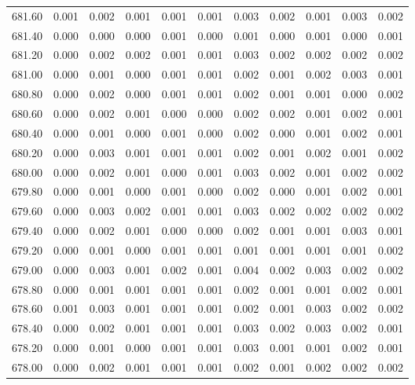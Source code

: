 \begin{longtable}{cccccccccc}
    681.60 &  0.001 &  0.002 &  0.001 &  0.001 &  0.001 &  0.003 &  0.002 &  0.001 &  0.003 &  0.002 \\
    681.40 &  0.000 &  0.000 &  0.000 &  0.001 &  0.000 &  0.001 &  0.000 &  0.001 &  0.000 &  0.001 \\
    681.20 &  0.000 &  0.002 &  0.002 &  0.001 &  0.001 &  0.003 &  0.002 &  0.002 &  0.002 &  0.002 \\
    681.00 &  0.000 &  0.001 &  0.000 &  0.001 &  0.001 &  0.002 &  0.001 &  0.002 &  0.003 &  0.001 \\
    680.80 &  0.000 &  0.002 &  0.000 &  0.001 &  0.001 &  0.002 &  0.001 &  0.001 &  0.000 &  0.002 \\
    680.60 &  0.000 &  0.002 &  0.001 &  0.000 &  0.000 &  0.002 &  0.002 &  0.001 &  0.002 &  0.001 \\
    680.40 &  0.000 &  0.001 &  0.000 &  0.001 &  0.000 &  0.002 &  0.000 &  0.001 &  0.002 &  0.001 \\
    680.20 &  0.000 &  0.003 &  0.001 &  0.001 &  0.001 &  0.002 &  0.001 &  0.002 &  0.001 &  0.002 \\
    680.00 &  0.000 &  0.002 &  0.001 &  0.000 &  0.001 &  0.003 &  0.002 &  0.001 &  0.002 &  0.002 \\
    679.80 &  0.000 &  0.001 &  0.000 &  0.001 &  0.000 &  0.002 &  0.000 &  0.001 &  0.002 &  0.001 \\
    679.60 &  0.000 &  0.003 &  0.002 &  0.001 &  0.001 &  0.003 &  0.002 &  0.002 &  0.002 &  0.002 \\
    679.40 &  0.000 &  0.002 &  0.001 &  0.000 &  0.000 &  0.002 &  0.001 &  0.001 &  0.003 &  0.001 \\
    679.20 &  0.000 &  0.001 &  0.000 &  0.001 &  0.001 &  0.001 &  0.001 &  0.001 &  0.001 &  0.002 \\
    679.00 &  0.000 &  0.003 &  0.001 &  0.002 &  0.001 &  0.004 &  0.002 &  0.003 &  0.002 &  0.002 \\
    678.80 &  0.000 &  0.001 &  0.001 &  0.001 &  0.001 &  0.002 &  0.001 &  0.001 &  0.002 &  0.001 \\
    678.60 &  0.001 &  0.003 &  0.001 &  0.001 &  0.001 &  0.002 &  0.001 &  0.003 &  0.002 &  0.002 \\
    678.40 &  0.000 &  0.002 &  0.001 &  0.001 &  0.001 &  0.003 &  0.002 &  0.003 &  0.002 &  0.001 \\
    678.20 &  0.000 &  0.001 &  0.000 &  0.001 &  0.001 &  0.003 &  0.001 &  0.001 &  0.002 &  0.001 \\
    678.00 &  0.000 &  0.002 &  0.001 &  0.001 &  0.001 &  0.002 &  0.001 &  0.002 &  0.002 &  0.002 \\

\end{longtable}
